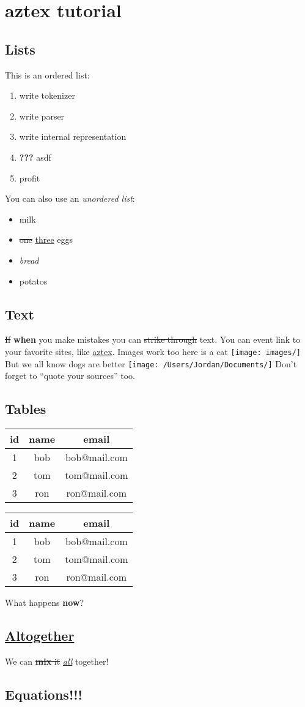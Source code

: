 \documentclass{article}
\begin{document}
\section{aztex tutorial}
\subsection{Lists}
This is an ordered list:
\begin{enumerate}
\item write tokenizer
\item write parser
\item write internal representation
\item \textbf{???} asdf
\item profit
\end{enumerate}
You can also use an \textit{unordered list}:
\begin{itemize}
\item milk
\item \sout{one} \underline{three} eggs
\item \textit{bread}
\item potatos
\end{itemize}
\subsection{Text}
\sout{If} \textbf{when} you make mistakes you can \sout{strike through} text.
You can event link to your favorite sites, like \href{http://github.com/thuc289/azTex}{aztex}.
Images work too here is a cat \texttt{[image: images/]}
But we all know dogs are better
\texttt{[image: /Users/Jordan/Documents/]}
Don't forget to ``quote your sources'' too.
\subsection{Tables}
\noindent
\begin{tabular}{| c | c | c |}
\hline 
id&name&email\\
\hline 
1&bob&bob@mail.com\\
\hline 
2&tom&tom@mail.com\\
\hline 
3&ron&ron@mail.com\\
\hline 
\end{tabular}

\noindent
\begin{tabular}{| c | c | c |}
\hline 
id&name&email\\
\hline 
1&bob&bob@mail.com\\
\hline 
2&tom&tom@mail.com\\
\hline 
3&ron&ron@mail.com\\
\hline 
\end{tabular}

What happens \textbf{now}?
\subsection{\underline{Altogether}}
We can \sout{\textbf{mix} it}  \underline{\textit{all}} together!
\subsection{Equations!!!}
\end{document}
